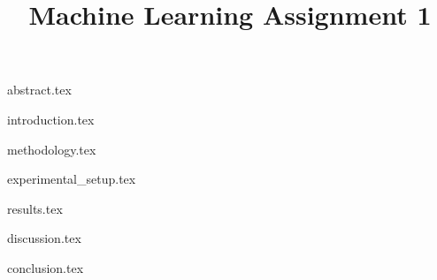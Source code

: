 \documentclass[conference]{IEEEtran}
\begin{document}
\title{Machine Learning Assignment 1\\}

\author{
}

\maketitle

{abstract.tex}

{introduction.tex}

{methodology.tex}

{experimental_setup.tex}

{results.tex}

{discussion.tex}

{conclusion.tex}

\newpage

\printbibliography
\end{document}
